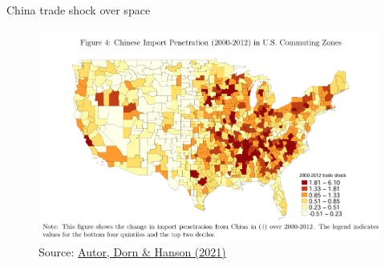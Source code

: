 \documentclass[notes,11pt, aspectratio=169, xcolor=table]{beamer}
\begin{document}
\begin{frame}{China trade shock over space}

\begin{figure}
    \centering
    \includegraphics[width=0.75\linewidth]{figs/china-trade-shock-penetration-map.png}  
    \caption{Source: \href{https://www.nber.org/system/files/working_papers/w29401/w29401.pdf}{Autor, Dorn \& Hanson (2021)}}
\end{figure}

\end{frame}
\end{document}
